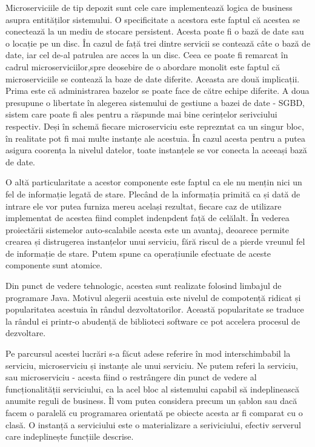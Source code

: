 \documentclass[12pt, a4paper, oneside, romanian]{teza-upb}
\begin{document}
Microserviciile de tip depozit sunt cele care implementează logica de business asupra entităților sistemului. O specificitate a acestora este faptul că acestea se conectează la un mediu de stocare persistent. Acesta poate fi o bază de date sau o locație pe un disc. În cazul de față trei dintre servicii se contează câte o bază de date, iar cel de-al patrulea are acces la un disc. Ceea ce poate fi remarcat în cadrul microserviciilor,spre deosebire de o abordare monolit este faptul că microserviciile se contează la baze de date diferite. Aceasta are două implicații. Prima este că administrarea bazelor se poate face de către echipe diferite. A doua presupune o libertate în alegerea sistemului de gestiune a bazei de date - SGBD, sistem care poate fi ales pentru a răspunde mai bine cerințelor serivciului respectiv. Deși în schemă fiecare microserviciu este reprezntat ca un singur bloc, în realitate pot fi mai multe instanțe ale acestuia. În cazul acesta pentru a putea asigura coorența la nivelul datelor, toate instanțele se vor conecta la aceeași bază de date.

O altă particularitate a acestor componente este faptul ca ele nu mențin nici un fel de informație legată de stare. Plecând de la informația primită ca și dată de intrare ele vor putea furniza mereu același rezultat, fiecare caz de utilizare implementat de acestea fiind complet indenpdent față de celălalt. În vederea proiectării sistemelor auto-scalabile acesta este un avantaj, deoarece permite crearea și distrugerea instanțelor unui serviciu, fără riscul de a pierde vreunul fel de informație de stare. Putem spune ca operațiunile efectuate de aceste componente sunt atomice. 

Din punct de vedere tehnologic, acestea sunt realizate folosind limbajul de programare Java. Motivul alegerii acestuia este nivelul de compotență ridicat și popularitatea acestuia în rândul dezvoltatorilor. Această popularitate se traduce la rândul ei printr-o abudență de biblioteci software ce pot accelera procesul de dezvoltare. 

Pe parcursul acestei lucrări s-a făcut adese referire în mod interschimbabil la serviciu, microserviciu și instanțe ale unui serviciu. Ne putem referi la serviciu, sau microserviciu - acesta fiind o restrângere din punct de vedere al funcționalității serviciului, ca la acel bloc al sistemului capabil să indeplinească anumite reguli de business. Îl vom putea considera precum un șablon sau dacă facem o paralelă cu programarea orientată pe obiecte acesta ar fi comparat cu o clasă. O instanță a serviciului este o materializare a seriviciului, efectiv serverul care indeplinește funcțiile descrise. 
\end{document}
